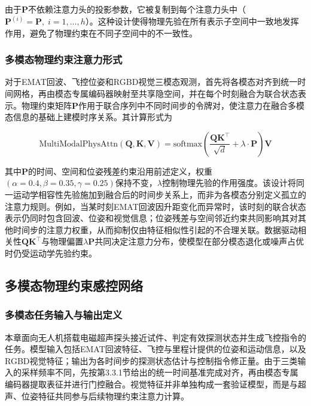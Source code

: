由于$\mathbf{P}$不依赖注意力头的投影参数，它被复制到每个注意力头中（$\mathbf{P}^{(i)} = \mathbf{P}, \; i = 1, \ldots, h$）。这种设计使得物理先验在所有表示子空间中一致地发挥作用，避免了物理约束在不同子空间中的不一致性。

\subsubsection{多模态物理约束注意力形式}

对于EMAT回波、飞控位姿和RGBD视觉三模态观测，首先将各模态对齐到统一时间网格，再由模态专属编码器映射至共享隐空间，并在每个时刻融合为联合状态表示。物理约束矩阵$\mathbf{P}$作用于联合序列中不同时间步的令牌对，使注意力在融合多模态信息的基础上建模时序关系。其计算形式为

\begin{equation}
\text{MultiModalPhysAttn}(\mathbf{Q}, \mathbf{K}, \mathbf{V}) = \text{softmax}\left(\frac{\mathbf{Q} \mathbf{K}^\top}{\sqrt{d}} + \lambda \cdot \mathbf{P}\right) \mathbf{V}
\label{eq:mm_physics_attention}
\end{equation}

其中$\mathbf{P}$的时间、空间和位姿残差约束沿用前述定义，权重$(\alpha=0.4, \beta=0.35, \gamma=0.25)$保持不变，$\lambda$控制物理先验的作用强度。该设计将同一运动学相容性先验施加到融合后的时间步关系上，而非为各模态分别定义孤立的注意力规则。例如，当某时刻EMAT回波因升距变化而异常时，该时刻的联合状态表示仍同时包含回波、位姿和视觉信息；位姿残差与空间邻近约束共同影响其对其他时间步的注意力权重，从而抑制仅由特征相似性引起的不合理关联。数据驱动相关性$\mathbf{Q}\mathbf{K}^{\top}$与物理偏置$\lambda\mathbf{P}$共同决定注意力分布，使模型在部分模态退化或噪声占优时仍受运动学先验约束。

\subsection{多模态物理约束感控网络}

\subsubsection{多模态任务输入与输出定义}

本章面向无人机搭载电磁超声探头接近试件、判定有效探测状态并生成飞控指令的任务。模型输入包括EMAT回波特征、飞控与里程计提供的位姿和运动信息，以及RGBD视觉特征；输出为各时间步的探测状态估计与控制指令修正量。由于三类输入的采样频率不同，先按第3.3.1节给出的统一时间基准完成对齐，再由模态专属编码器提取表征并进行门控融合。视觉特征并非单独构成一套验证模型，而是与超声、位姿特征共同参与后续物理约束注意力计算。

